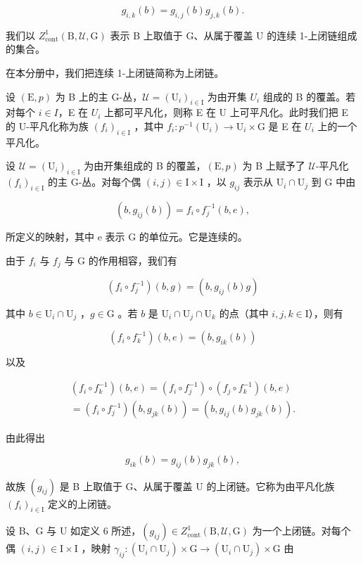 \[
g _ {i, k} (b) = g _ {i, j} (b) g _ {j, k} (b).
\]

我们以 \(Z_{\mathrm{cont}}^{1}(\mathrm{B},\mathcal{U},\mathrm{G})\) 表示 B 上取值于 G、从属于覆盖 U 的连续 1-上闭链组成的集合。

在本分册中，我们把连续 1-上闭链简称为上闭链。

设 \((\mathrm{E},p)\) 为 B 上的主 G-丛，\(\mathcal{U} = (\mathrm{U}_{i})_{i\in\mathrm{I}}\) 为由开集 \(U_{i}\) 组成的 B 的覆盖。若对每个 \(i\in I\)，E 在 \(U_{i}\) 上都可平凡化，则称 E 在 U 上可平凡化。此时我们把 E 的 U-平凡化称为族 \((f_{i})_{i\in\mathrm{I}}\) ，其中 \(f_{i}\colon p^{-1}(\mathrm{U}_{i})\to\mathrm{U}_{i}\times\mathrm{G}\) 是 E 在 \(U_{i}\) 上的一个平凡化。

设 \(\mathcal{U} = (\mathrm{U}_i)_{i\in \mathrm{I}}\) 为由开集组成的 B 的覆盖，\((\mathrm{E},p)\) 为 B 上赋予了 \(\mathcal{U}\)-平凡化 \((f_i)_{i\in \mathrm{I}}\) 的主 G-丛。对每个偶 \((i,j)\in \mathrm{I}\times \mathrm{I}\) ，以 \(g_{ij}\) 表示从 \(\mathrm{U}_i\cap \mathrm{U}_j\) 到 G 中由

\[
(b, g _ {i j} (b)) = f _ {i} \circ f _ {j} ^ {- 1} (b, e),
\]

所定义的映射，其中 e 表示 G 的单位元。它是连续的。

由于 \(f_{i}\) 与 \(f_{j}\) 与 G 的作用相容，我们有

\[
(f _ {i} \circ f _ {j} ^ {- 1}) (b, g) = (b, g _ {i j} (b) g)
\]

其中 \(b \in \mathrm{U}_i \cap \mathrm{U}_j\) ，\(g \in \mathrm{G}\) 。若 \(b\) 是 \(\mathrm{U}_i \cap \mathrm{U}_j \cap \mathrm{U}_k\) 的点（其中 \(i, j, k \in \mathrm{I}\)），则有

\[
(f _ {i} \circ f _ {k} ^ {- 1}) (b, e) = (b, g _ {i k} (b))
\]

以及

\[
\begin{array}{c} (f _ {i} \circ f _ {k} ^ {- 1}) (b, e) = (f _ {i} \circ f _ {j} ^ {- 1}) \circ (f _ {j} \circ f _ {k} ^ {- 1}) (b, e) \\ = (f _ {i} \circ f _ {j} ^ {- 1}) (b, g _ {j k} (b)) = (b, g _ {i j} (b) g _ {j k} (b)). \end{array}
\]

由此得出

\[
g _ {i k} (b) = g _ {i j} (b) g _ {j k} (b),
\]

故族 \((g_{ij})\) 是 B 上取值于 G、从属于覆盖 U 的上闭链。它称为由平凡化族 \((f_{i})_{i\in\mathrm{I}}\) 定义的上闭链。

设 B、G 与 U 如定义 6 所述，\((g_{ij}) \in Z_{\mathrm{cont}}^{1}(\mathrm{B}, \mathcal{U}, \mathrm{G})\) 为一个上闭链。对每个偶 \((i, j) \in \mathrm{I} \times \mathrm{I}\) ，映射 \(\gamma_{ij} \colon (\mathrm{U}_{i} \cap \mathrm{U}_{j}) \times \mathrm{G} \to (\mathrm{U}_{i} \cap \mathrm{U}_{j}) \times \mathrm{G}\) 由


